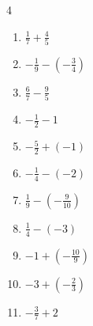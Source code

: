 \begin{multicols}{4}
\begin{enumerate}

  \item $\displaystyle \frac{1}{7} + \frac{4}{5}$


  \item $\displaystyle -\frac{1}{9} - \left(-\frac{3}{4}\right)$


  \item $\displaystyle \frac{6}{7} - \frac{9}{5}$


\columnbreak %

\resetques

  \item $\displaystyle -\frac{1}{2} - 1$


  \item $\displaystyle -\frac{5}{2} + \left(-1\right)$


  \item $\displaystyle -\frac{1}{4} - \left(-2\right)$


  \item $\displaystyle \frac{1}{9} - \left(-\frac{9}{10}\right)$


  \item $\displaystyle \frac{1}{4} - \left(-3\right)$


  \item $\displaystyle -1 + \left(-\frac{10}{9}\right)$


  \item $\displaystyle -3 + \left(-\frac{2}{3}\right)$


  \item $\displaystyle -\frac{3}{7} + 2$



\end{enumerate}
\end{multicols}
